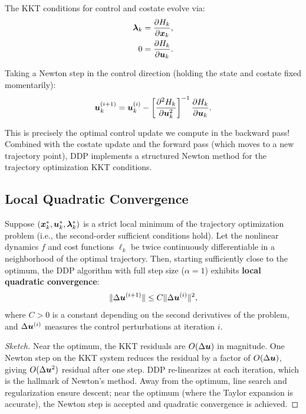 The KKT conditions for control and costate evolve via:
\begin{align}
\bm{\lambda}_k &= \frac{\partial H_k}{\partial \bm{x}_k}, \label{eq:ch5:costate-recurse}\\
0 &= \frac{\partial H_k}{\partial \bm{u}_k}. \label{eq:ch5:control-first-order}
\end{align}

Taking a Newton step in the control direction (holding the state and costate fixed momentarily):
\begin{equation}
\bm{u}_k^{(i+1)} = \bm{u}_k^{(i)} - \left[\frac{\partial^2 H_k}{\partial \bm{u}_k^2}\right]^{-1} \frac{\partial H_k}{\partial \bm{u}_k}.
\label{eq:ch5:newton-control}
\end{equation}

This is precisely the optimal control update we compute in the backward pass! Combined with the costate update
and the forward pass (which moves to a new trajectory point), DDP implements a structured Newton method for the
trajectory optimization KKT conditions.

\subsection{Local Quadratic Convergence}

\begin{theorem}
\label{thm:ch5:ddp-convergence}
Suppose $(\bm{x}_k^*, \bm{u}_k^*, \bm{\lambda}_k^*)$ is a strict local minimum of the trajectory optimization problem
(i.e., the second-order sufficient conditions hold). Let the nonlinear dynamics $f$ and cost functions $\ell_k$ be
twice continuously differentiable in a neighborhood of the optimal trajectory. Then, starting sufficiently close
to the optimum, the DDP algorithm with full step size ($\alpha = 1$) exhibits \textbf{local quadratic convergence}:
\begin{equation}
\|\Delta\bm{u}^{(i+1)}\| \leq C \|\Delta\bm{u}^{(i)}\|^2,
\label{eq:ch5:quad-convergence}
\end{equation}
where $C > 0$ is a constant depending on the second derivatives of the problem, and $\Delta\bm{u}^{(i)}$ measures
the control perturbations at iteration $i$.
\end{theorem}

\begin{proof}[Sketch]
Near the optimum, the KKT residuals are $O(\Delta\bm{u})$ in magnitude. One Newton step on the KKT system
reduces the residual by a factor of $O(\Delta\bm{u})$, giving $O(\Delta\bm{u}^2)$ residual after one step.
DDP re-linearizes at each iteration, which is the hallmark of Newton's method. Away from the optimum,
line search and regularization ensure descent; near the optimum (where the Taylor expansion is accurate),
the Newton step is accepted and quadratic convergence is achieved.
\end{proof}

